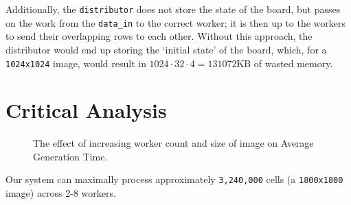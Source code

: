 \documentclass{article}
\begin{document}
    Additionally, the \verb|distributor| does not store the state of the board, but passes on the work from the \verb|data_in| to the correct worker; it is then up to the workers to send their overlapping rows to each other. Without this approach, the distributor would end up storing the `initial state' of the board, which, for a \verb|1024x1024| image, would result in $1024 \cdot 32 \cdot 4 = 131072$KB of wasted memory.

    

    \pagebreak

    \section{Critical Analysis}
    
    \begin{figure}
        \begin{center}
            
            \caption{The effect of increasing worker count and size of image on Average Generation Time.}
            \label{fig:agt}
        \end{center}
    \end{figure}
    Our system can maximally process approximately \verb|3,240,000| cells (a \verb|1800x1800| image) across 2-8 workers. 
\end{document}
